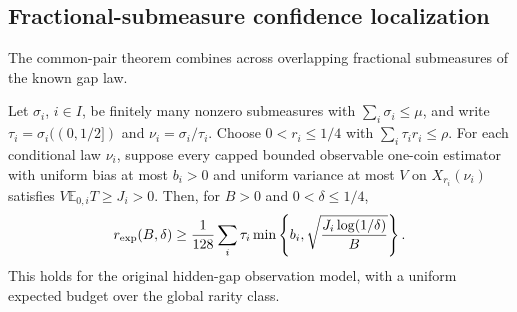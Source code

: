 \clearpage
\subsection{Fractional-submeasure confidence localization}
\label{sec:additive-confidence}

The common-pair theorem combines across overlapping fractional
submeasures of the known gap law.

\begin{theorem}
\label{thm:additive-confidence-verified}
Let $\sigma_i$, $i\in I$, be finitely many nonzero submeasures with
$\sum_i\sigma_i\le\mu$, and write
$\tau_i=\sigma_i((0,1/2])$ and $\nu_i=\sigma_i/\tau_i$.
Choose $0<r_i\le1/4$ with $\sum_i\tau_i r_i\le\rho$.
For each conditional law $\nu_i$, suppose every capped bounded
observable one-coin estimator with uniform bias at most $b_i>0$
and uniform variance at most $V$ on $X_{r_i}(\nu_i)$ satisfies
$V\mathbb E_{0,i}T\ge J_i>0$.
Then, for $B>0$ and $0<\delta\le1/4$,
\[
 r_{\rm exp}(B,\delta)\ge
 \frac1{128}\sum_i\tau_i
 \min\left\{b_i,\sqrt{\frac{J_i\log(1/\delta)}{B}}\right\}.
\]
This holds for the original hidden-gap observation model, with a
uniform expected budget over the global rarity class.
\end{theorem}

